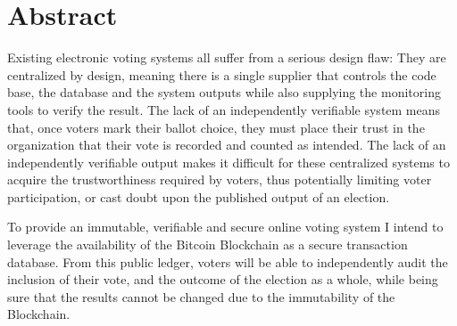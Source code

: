 \documentclass{article}
\begin{document}
    \section{Abstract}
		Existing electronic voting systems all suffer from a serious design flaw: They are centralized by design, meaning there is a single supplier that controls the code base, the database and the system outputs while also supplying the monitoring tools to verify the result. The lack of an independently verifiable system means that, once voters mark their ballot choice, they must place their trust in the organization that their vote is recorded and counted as intended. The lack of an independently verifiable output makes it difficult for these centralized systems to acquire the trustworthiness required by voters, thus potentially limiting voter participation, or cast doubt upon the published output of an election.

		To provide an immutable, verifiable and secure online voting system I intend to leverage the availability of the Bitcoin Blockchain as a secure transaction database. From this public ledger, voters will be able to independently audit the inclusion of their vote, and the outcome of the election as a whole, while being sure that the results cannot be changed due to the immutability of the Blockchain.
\end{document}
